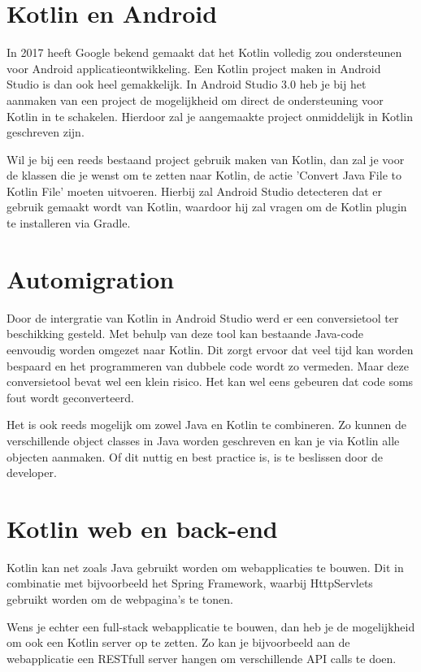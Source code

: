 \section{Kotlin en Android}
\label{sec:kotlinandroid}
In 2017 heeft Google bekend gemaakt dat het Kotlin volledig zou ondersteunen voor Android applicatieontwikkeling. Een Kotlin project maken in Android Studio is dan ook heel gemakkelijk. In Android Studio 3.0 heb je bij het aanmaken van een project de mogelijkheid om direct de ondersteuning voor Kotlin in te schakelen. Hierdoor zal je aangemaakte project onmiddelijk in Kotlin geschreven zijn.

Wil je bij een reeds bestaand project gebruik maken van Kotlin, dan zal je voor de klassen die je wenst om te zetten naar Kotlin, de actie 'Convert Java File to Kotlin File' moeten uitvoeren. Hierbij zal Android Studio detecteren dat er gebruik gemaakt wordt van Kotlin, waardoor hij zal vragen om de Kotlin plugin te installeren via Gradle.

\section{Automigration}
\label{sec:Automigration}
Door de intergratie van Kotlin in Android Studio werd er een conversietool ter beschikking gesteld. Met behulp van deze tool kan bestaande Java-code eenvoudig worden omgezet naar Kotlin. Dit zorgt ervoor dat veel tijd kan worden bespaard en het programmeren van dubbele code wordt zo vermeden. Maar deze conversietool bevat wel een klein risico. Het kan wel eens gebeuren dat code soms fout wordt geconverteerd. 

Het is ook reeds mogelijk om zowel Java en Kotlin te combineren. Zo kunnen de verschillende object classes in Java worden geschreven en kan je via Kotlin alle objecten aanmaken. Of dit nuttig en best practice is, is te beslissen door de developer.

\section{Kotlin web en back-end}
\label{sec:kotlincrossplatform}
Kotlin kan net zoals Java gebruikt worden om webapplicaties te bouwen. Dit in combinatie met bijvoorbeeld het Spring Framework, waarbij HttpServlets gebruikt worden om de webpagina's te tonen.

Wens je echter een full-stack webapplicatie te bouwen, dan heb je de mogelijkheid om ook een Kotlin server op te zetten. Zo kan je bijvoorbeeld aan de webapplicatie een RESTfull server hangen om verschillende API calls te doen.

